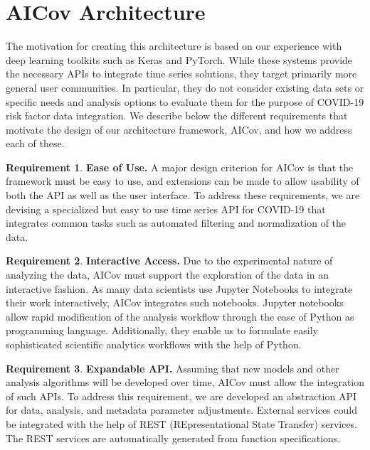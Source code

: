 \documentclass[12pt]{article}
\theoremstyle{definition}
\newtheorem{requirement}{Requirement}
\renewcommand{\_}{%
    \textunderscore\hspace{0pt}%
}
\begin{document}
\section{AICov Architecture}
\label{sec:arch}

The motivation for creating this architecture is based on our experience with deep learning toolkits such as Keras and PyTorch. While these systems provide the necessary APIs to integrate time series solutions, they target primarily more general user communities. In particular, they do not consider existing data sets or specific needs and analysis options to evaluate them for the purpose of COVID-19 risk factor data integration. We describe below the different requirements that motivate the design of our architecture framework, AICov, and how we address each of these.

\newcommand{\Solution}{}

\begin{requirement}{\bf Ease of Use.} A major design criterion for AICov is that the framework must be easy to use, and extensions can be made to allow usability of both the API as well as the user interface. \Solution To address these requirements, we are devising a specialized but easy to use time series API for COVID-19 that integrates common tasks such as automated filtering and normalization of the data.
\end{requirement}


\begin{requirement}{\bf Interactive Access.} Due to the experimental nature of analyzing the data, AICov must support the exploration of the data in an interactive fashion. \Solution As many data scientists use Jupyter Notebooks to integrate their work interactively, AICov integrates such notebooks. Jupyter notebooks allow rapid modification of the analysis workflow through the ease of Python as programming language. Additionally, they enable us to formulate easily sophisticated scientific analytics workflows with the help of Python.
\end{requirement}


\begin{requirement}{\bf Expandable API.} Assuming that new models and other analysis algorithms will be developed over time, AICov must allow the integration of such APIs. \Solution To address this requirement, we are developed an abstraction API for data, analysis, and metadata parameter adjustments. External services could be integrated with the help of REST (REpresentational State Transfer) services. The REST services are automatically generated from function specifications. 
\end{requirement}
\end{document}
